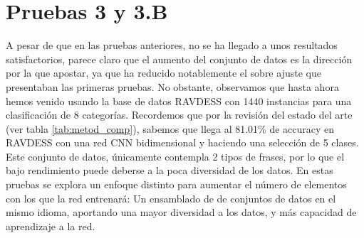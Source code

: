 \documentclass[11pt,a4paper,spanish]{book}
\begin{document}
	\section{Pruebas 3 y 3.B}
	A pesar de que en las pruebas anteriores, no se ha llegado a unos resultados satisfactorios, parece claro que el aumento del conjunto de datos es la dirección por la que apostar, ya que ha reducido notablemente el sobre ajuste que presentaban las primeras pruebas. No obstante, observamos que hasta ahora hemos venido usando la base de datos RAVDESS con 1440 instancias para una clasificación de 8 categorías. Recordemos que por la revisión del estado del arte (ver tabla \ref{tab:metod_comp}), sabemos que \cite{Mustaqeem2020} llega al 81.01\% de accuracy en RAVDESS con una red CNN bidimensional y haciendo una selección de 5 clases. Este conjunto de datos, únicamente contempla 2 tipos de frases, por lo que el bajo rendimiento puede deberse a la poca diversidad de los datos. 
	En estas pruebas se explora un enfoque distinto para aumentar el número de elementos con los que la red entrenará: Un ensamblado de de conjuntos de datos en el mismo idioma, aportando una mayor diversidad a los datos, y más capacidad de aprendizaje a la red.
		
		
		
		
		
		
		

	\printbibliography
	
\end{document}
